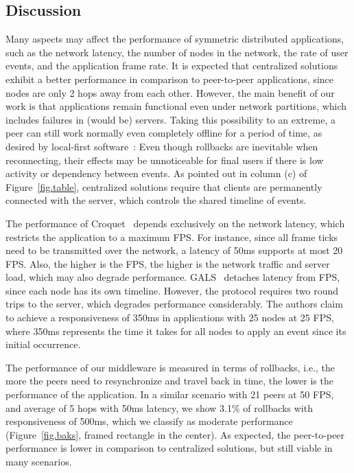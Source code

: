 \documentclass[10pt,journal,compsoc]{IEEEtran}
\begin{document}
\subsection{Discussion}

Many aspects may affect the performance of symmetric distributed applications,
such as
    the network latency,
    the number of nodes in the network,
    the rate of user events,
    and the application frame rate.
%
It is expected that centralized solutions exhibit a better performance in
comparison to peer-to-peer applications, since nodes are only 2 hops away from
each other.
%
However, the main benefit of our work is that applications remain functional
even under network partitions, which includes failures in (would be) servers.
Taking this possibility to an extreme, a peer can still work normally even
completely offline for a period of time, as desired by local-first
software~\cite{local}:
Even though rollbacks are inevitable when reconnecting, their effects may be
unnoticeable for final users if there is low activity or dependency between
events.
%
As pointed out in column (c) of Figure~\ref{fig.table}, centralized solutions
require that clients are permanently connected with the server, which controls
the shared timeline of events.

The performance of Croquet~\cite{croquet} depends exclusively on the network
latency, which restricts the application to a maximum FPS.
For instance, since all frame ticks need to be transmitted over the network,
a latency of 50ms supports at most 20 FPS.
Also, the higher is the FPS, the higher is the network traffic and server load,
which may also degrade performance.
%
GALS~\cite{gals} detaches latency from FPS, since each node has its own
timeline.
However, the protocol requires two round trips to the server, which degrades
performance considerably.
The authors claim to achieve a responsiveness of 350ms in applications with
25 nodes at 25 FPS, where 350ms represents the time it takes for all nodes to
apply an event since its initial occurrence.

The performance of our middleware is measured in terms of rollbacks, i.e., the
more the peers need to resynchronize and travel back in time, the lower is the
performance of the application.
In a similar scenario with 21 peers at 50 FPS, and average of 5 hops with 50ms
latency, we show 3.1\% of rollbacks with responsiveness of 500ms, which we
classify as moderate performance (Figure~\ref{fig.baks}, framed rectangle in
the center).
As expected, the peer-to-peer performance is lower in comparison to centralized
solutions, but still viable in many scenarios.
\end{document}
